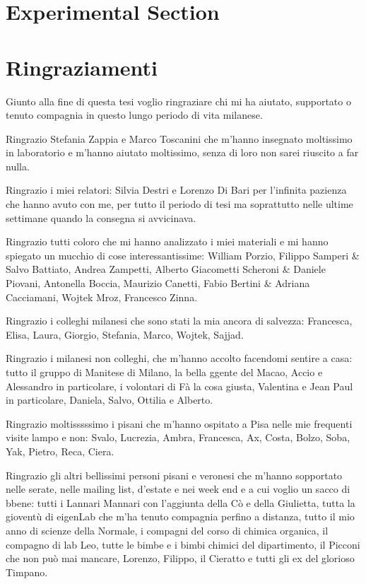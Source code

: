 \documentclass[a4paper,12pt,openright]{book}
\begin{document}
\chapter{Experimental Section}



\chapter*{Ringraziamenti}

Giunto alla fine di questa tesi voglio ringraziare chi mi ha aiutato, supportato o tenuto compagnia in questo lungo periodo di vita milanese.

Ringrazio Stefania Zappia e Marco Toscanini che m'hanno insegnato moltissimo in laboratorio e m'hanno aiutato moltissimo, senza di loro non sarei riuscito a far nulla.

Ringrazio i miei relatori: Silvia Destri e Lorenzo Di Bari per l'infinita pazienza che hanno avuto con me, per tutto il periodo di tesi ma soprattutto nelle ultime settimane quando la consegna si avvicinava.

Ringrazio tutti coloro che mi hanno analizzato i miei materiali e mi hanno spiegato un mucchio di cose interessantissime: William Porzio, Filippo Samperi \& Salvo Battiato, Andrea Zampetti, Alberto Giacometti Scheroni \& Daniele Piovani, Antonella Boccia, Maurizio Canetti, Fabio Bertini \& Adriana Cacciamani, Wojtek Mroz, Francesco Zinna.

Ringrazio i colleghi milanesi che sono stati la mia ancora di salvezza: Francesca, Elisa, Laura, Giorgio, Stefania, Marco, Wojtek, Sajjad.

Ringrazio i milanesi non colleghi, che m'hanno accolto facendomi sentire a casa: tutto il gruppo di Manitese di Milano, la bella ggente del Macao, Accio e Alessandro in particolare, i volontari di Fà la cosa giusta, Valentina e Jean Paul in particolare, Daniela, Salvo, Ottilia e Alberto.

Ringrazio moltisssssimo i pisani che m'hanno ospitato a Pisa nelle mie frequenti visite lampo e non: Svalo, Lucrezia, Ambra, Francesca, Ax, Costa, Bolzo, Soba, Yak, Pietro, Reca, Ciera.

Ringrazio gli altri bellissimi personi pisani e veronesi che m'hanno sopportato nelle serate, nelle mailing list, d'estate e nei week end e a cui voglio un sacco di bbene: tutti i Lannari Mannari con l'aggiunta della Cò e della Giulietta, tutta la gioventù di eigenLab che m'ha tenuto compagnia perfino a distanza, tutto il mio anno di scienze della Normale, i compagni del corso di chimica organica, il compagno di lab Leo, tutte le bimbe e i bimbi chimici del dipartimento, il Picconi che non può mai mancare, Lorenzo, Filippo, il Cieratto e tutti gli ex del glorioso Timpano.
\end{document}
